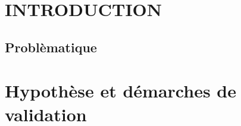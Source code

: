 \documentclass[a4paper]{article}
\begin{document}
\section{INTRODUCTION}
\begin{comment}
MANSUBA est un jeu de plateau qui a un but similaire au jeu de Shtranj mais avec des conditions de victoire légèrement différente. 
Le nombre de joueur , le nombre de pions et la taille du plateau sont bien définis dans le fichier encadrant la géometrie du sujet (geometry.h)
BOARD : 
Le plateau de jeu et la combinaison d'un monde et d'une relation .
  WORLD : 
Le monde représente les positions accessibles pour le jeu qui est dans un sens algorithmique une liste de cases . Ce monde est initialisé par la structure world_t ...
  RELATION : 
Les voisins sont les cases environant directement une case en question et qui sont dans l'une des directions enuméres dans le fichier geometry et qui dépendent de leurs
positions dans le monde (enum dir_t) ...
une relation est l'ensemble des possibilité d'avoir un mouvement directe d'une case à l'autre dans une direction permise par les régles actuelles du jeu pour une case choisie.
 INITIALISATION : 
L'état du BOARD qu'on traite dans le début de sujet sera une grille 2D avec deux joueurs et 8 directions d'orientation .
\end{comment}
\subsection{Problèmatique}
\begin{comment}
Le but de notre projet sera de jouer une partie de jeu aléatoire, puis rendre l'algorithme de plus en plus flexible et général
et l'orienter vers la victoire. 

\end{comment}
\section{Hypothèse et démarches de validation}


\section{}
\end{document}
